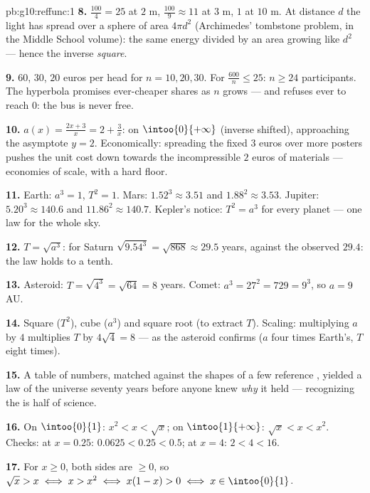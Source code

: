 \begin{solution}{pb:g10:reffunc:1}
\textbf{8.} $\frac{100}{4} = 25$ at $2$ m,
$\frac{100}{9} \approx 11$ at $3$ m, $1$ at $10$ m. At distance
$d$ the light has spread over a sphere of area $4\pi d^2$
(Archimedes' tombstone problem, in the Middle School volume): the same energy divided by an area
growing like $d^2$ --- hence the inverse \emph{square}.

\textbf{9.} $60$, $30$, $20$ euros per head for $n = 10, 20,
30$. For $\frac{600}{n} \leq 25$: $n \geq 24$ participants. The
hyperbola promises ever-cheaper shares as $n$ grows --- and
refuses ever to reach $0$: the bus is never free.

\textbf{10.} $a(x) = \frac{2x + 3}{x} = 2 + \frac3x$:
 on $\intoo{0}{+\infty}$ (inverse  shifted),
approaching the asymptote $y = 2$. Economically: spreading the
fixed $3$ euros over more posters pushes the unit cost down
towards the incompressible $2$ euros of materials --- economies
of scale, with a hard floor.

\textbf{11.} Earth: $a^3 = 1$, $T^2 = 1$. Mars:
$1.52^3 \approx 3.51$ and $1.88^2 \approx 3.53$. Jupiter:
$5.20^3 \approx 140.6$ and $11.86^2 \approx 140.7$. Kepler's
notice: $T^2 = a^3$ for every planet --- one law for the whole
sky.

\textbf{12.} $T = \sqrt{a^3}$: for Saturn
$\sqrt{9.54^3} = \sqrt{868} \approx 29.5$ years, against the
observed $29.4$: the law holds to a tenth.

\textbf{13.} Asteroid: $T = \sqrt{4^3} = \sqrt{64} = 8$ years.
Comet: $a^3 = 27^2 = 729 = 9^3$, so $a = 9$ AU.

\textbf{14.} Square ($T^2$), cube ($a^3$) and square root (to
extract $T$). Scaling: multiplying $a$ by $4$ multiplies $T$ by
$4\sqrt4 = 8$ --- as the asteroid confirms ($a$ four times
Earth's, $T$ eight times).

\textbf{15.} A table of numbers, matched against the shapes of
a few reference , yielded a law of the universe
seventy years before anyone knew \emph{why} it held ---
recognizing the  is half of science.

\textbf{16.} On $\intoo{0}{1}$: $x^2 < x < \sqrt x$; on
$\intoo{1}{+\infty}$: $\sqrt x < x < x^2$. Checks: at
$x = 0.25$: $0.0625 < 0.25 < 0.5$; at $x = 4$:
$2 < 4 < 16$.

\textbf{17.} For $x \geq 0$, both sides are $\geq 0$, so
$\sqrt x > x \iff x > x^2 \iff x(1 - x) > 0 \iff
x \in \intoo{0}{1}$.


\end{solution}
